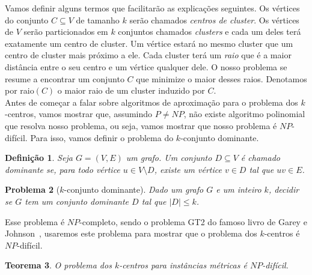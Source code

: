 \documentclass[12pt]{article}
\newtheorem{theorem}{Teorema}[section]
\newtheorem{definition}[theorem]{Definição}
\newtheorem{problem}[theorem]{Problema}
\newcommand{\NP}{\mathit{NP}}
\begin{document}
Vamos definir alguns termos que facilitarão as explicações seguintes. Os vértices do conjunto $C \subseteq V$ de tamanho $k$ serão chamados \emph{centros de cluster}. Os vértices de $V$ serão particionados em $k$ conjuntos chamados \emph{clusters} e cada um deles terá exatamente um centro de cluster. Um vértice estará no mesmo cluster que um centro de cluster mais próximo a ele. Cada cluster terá um \emph{raio} que é a maior distância entre o seu centro e um vértice qualquer dele. O nosso problema se resume a encontrar um conjunto $C$ que minimize o maior desses raios. Denotamos por raio$(C)$ o maior raio de um cluster induzido por $C$.\\
Antes de começar a falar sobre algoritmos de aproximação para o problema dos $k$-centros, vamos mostrar que, assumindo $P\not=\NP$, não existe algoritmo polinomial que resolva nosso problema, ou seja, vamos mostrar que nosso problema é $\NP$-difícil. Para isso, vamos definir o problema do $k$-conjunto dominante.

\begin{definition}
    Seja $G = (V,E)$ um grafo. Um conjunto $D \subseteq V$ é chamado \emph{dominante} se, para todo vértice $u \in V \setminus D$, existe um vértice $v \in D$ tal que $uv \in E$.
\end{definition}

\begin{problem}[$k$-conjunto dominante]
    Dado um grafo $G$ e um inteiro $k$, decidir se $G$ tem um conjunto dominante $D$ tal que $|D| \leq k$.      
\end{problem}
Esse problema é $\NP$-completo, sendo o problema GT2 do famoso livro de Garey e Johnson~\cite{garey1979computers}, usaremos este problema para mostrar que o problema dos $k$-centros é $\NP$-difícil.

\begin{theorem}\label{theorem:2.1}
    O problema dos $k$-centros para instâncias métricas é $\NP$-difícil.
\end{theorem}
\end{document}
